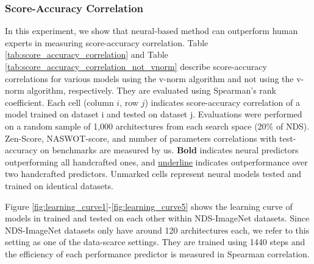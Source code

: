 \documentclass[lettersize,journal]{IEEEtran}
\begin{document}
        \subsubsection{Score-Accuracy Correlation}
            In this experiment, we show that neural-based method can outperform human experts in measuring score-accuracy correlation. Table \ref{tab:score_accuracy_correlation} and Table \ref{tab:score_accuracy_correlation_not_vnorm} describe score-accuracy correlations for various models using the v-norm algorithm and not using the v-norm algorithm, respectively. They are evaluated using Spearman's rank coefficient. Each cell (column $i$, row $j$) indicates score-accuracy correlation of a model trained on dataset i and tested on dataset j. Evaluations were performed on a random sample of 1,000 architectures from each search space (20\% of NDS). Zen-Score, NASWOT-score, and number of parameters correlations with test-accuracy on benchmarks are measured by us. \textbf{Bold} indicates neural predictors outperforming all handcrafted ones, and \underline{underline} indicates outperformance over two handcrafted predictors. Unmarked cells represent neural models tested and trained on identical datasets.

            Figure \ref{fig:learning_curve1}-\ref{fig:learning_curve5} shows the learning curve of models in trained and tested on each other within NDS-ImageNet datasets. Since NDS-ImageNet datasets only have around 120 architectures each, we refer to this setting as one of the data-scarce settings. They are trained using 1440 steps and the efficiency of each performance predictor is measured in Spearman correlation.
\end{document}
